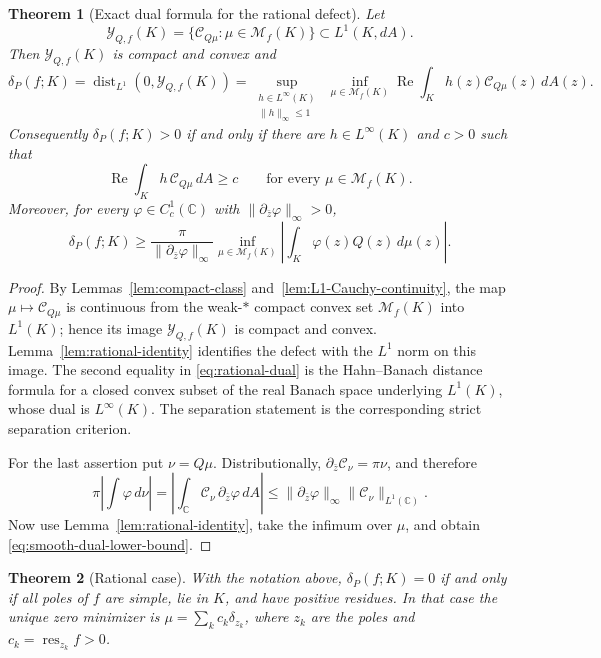 \documentclass[10pt,a4paper]{amsart}
\newtheorem{theorem}{Theorem}[section]
\newcommand{\bC}{\mathbb C}
\newcommand{\M}{\mathcal M}
\newcommand{\Cauchy}{\mathcal C}
\renewcommand{\Re}{\operatorname{Re}}
\begin{document}
\begin{theorem}[Exact dual formula for the rational defect]
\label{thm:rational-dual}
Let
\[
 \mathcal Y_{Q,f}(K)
 =\{\Cauchy_{Q\mu}:\mu\in\M_f(K)\}\subset L^1(K,dA).
\]
Then $\mathcal Y_{Q,f}(K)$ is compact and convex and
\begin{equation}\label{eq:rational-dual}
 \delta_P(f;K)
 =\operatorname{dist}_{L^1}(0,\mathcal Y_{Q,f}(K))
 =\sup_{\substack{h\in L^\infty(K)\\ \|h\|_\infty\leq1}}
   \ \inf_{\mu\in\M_f(K)}
   \Re\int_K h(z)\Cauchy_{Q\mu}(z)\,dA(z).
\end{equation}
Consequently $\delta_P(f;K)>0$ if and only if there are
$h\in L^\infty(K)$ and $c>0$ such that
\[
 \Re\int_K h\,\Cauchy_{Q\mu}\,dA\geq c
 \qquad\text{for every }\mu\in\M_f(K).
\]
Moreover, for every $\varphi\in C_c^1(\bC)$ with
$\|\partial_{\bar z}\varphi\|_\infty>0$,
\begin{equation}\label{eq:smooth-dual-lower-bound}
 \delta_P(f;K)
 \geq
 \frac{\pi}{\|\partial_{\bar z}\varphi\|_\infty}
 \inf_{\mu\in\M_f(K)}
 \left|\int_K \varphi(z)Q(z)\,d\mu(z)\right|.
\end{equation}
\end{theorem}

\begin{proof}
By Lemmas~\ref{lem:compact-class} and~\ref{lem:L1-Cauchy-continuity}, the map
$\mu\mapsto\Cauchy_{Q\mu}$ is continuous from the weak-$*$ compact convex set
$\M_f(K)$ into $L^1(K)$; hence its image $\mathcal Y_{Q,f}(K)$ is compact and
convex.  Lemma~\ref{lem:rational-identity} identifies the defect with the
$L^1$ norm on this image.  The second equality in
\eqref{eq:rational-dual} is the Hahn--Banach distance formula for a closed
convex subset of the real Banach space underlying $L^1(K)$, whose dual is
$L^\infty(K)$.  The separation statement is the corresponding strict
separation criterion.

For the last assertion put $\nu=Q\mu$.  Distributionally,
$\partial_{\bar z}\Cauchy_\nu=\pi\nu$, and therefore
\[
 \pi\left|\int\varphi\,d\nu\right|
 =\left|\int_{\bC}\Cauchy_\nu\,
        \partial_{\bar z}\varphi\,dA\right|
 \leq \|\partial_{\bar z}\varphi\|_\infty
       \|\Cauchy_\nu\|_{L^1(\bC)}.
\]
Now use Lemma~\ref{lem:rational-identity}, take the infimum over $\mu$, and
obtain \eqref{eq:smooth-dual-lower-bound}.
\end{proof}


\begin{theorem}[Rational case]\label{thm:rational}
With the notation above, $\delta_P(f;K)=0$ if and only if all poles of $f$ are
simple, lie in $K$, and have positive residues.  In that case the unique zero
minimizer is $\mu=\sum_k c_k\delta_{z_k}$, where $z_k$ are the poles and
$c_k=\operatorname{res}_{z_k}f>0$.
\end{theorem}
\end{document}
